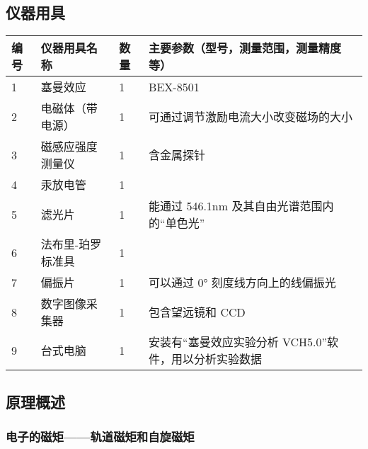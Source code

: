 \documentclass[dvipsnames, svgnames,a4paper,11pt]{article}
\begin{document}
	\subsection{仪器用具}
\begin{table}[htbp]
    \centering
    \renewcommand\arraystretch{1.6}
    \begin{tabular}{p{}|p{}|p{}|p{}}
        \hline
        编号 & 仪器用具名称 & 数量 & 主要参数（型号，测量范围，测量精度等） \\
        \hline
        1 & 塞曼效应 & 1 & BEX-8501 \\
        2 & 电磁体（带电源） & 1 & 可通过调节激励电流大小改变磁场的大小 \\
        3 & 磁感应强度测量仪 & 1 & 含金属探针 \\
        4 & 汞放电管 & 1 & \\
        5 & 滤光片 & 1 & 能通过 546.1nm 及其自由光谱范围内的“单色光” \\
        6 & 法布里-珀罗标准具 & 1 &  \\
        7 & 偏振片 & 1 & 可以通过 0° 刻度线方向上的线偏振光\\
        8 & 数字图像采集器 & 1 & 包含望远镜和 CCD \\
        9 & 台式电脑 & 1 & 安装有“塞曼效应实验分析 VCH5.0”软件，用以分析实验数据 \\
        \hline
    \end{tabular}
\end{table}
	
	\subsection{原理概述}
	\subsubsection{电子的磁矩——轨道磁矩和自旋磁矩}
\end{document}
